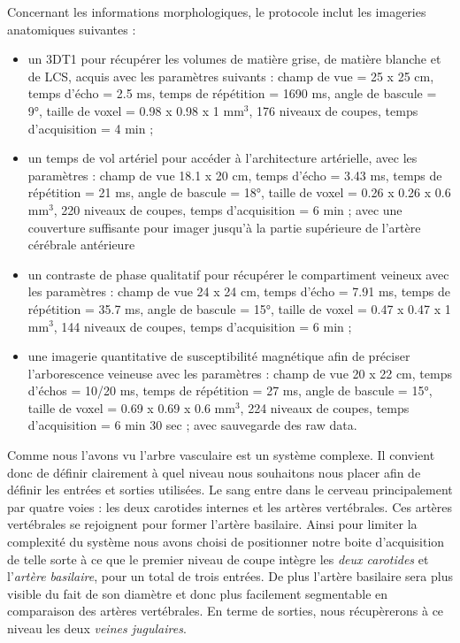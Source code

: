 Concernant les informations morphologiques, le protocole inclut les imageries anatomiques suivantes :
\begin{itemize}
\item un 3DT1 pour récupérer les volumes de matière grise, de matière blanche et de LCS, acquis avec les paramètres suivants : champ de vue = 25 x 25 cm, temps d’écho = 2.5 ms, temps de répétition = 1690 ms, angle de bascule = 9°, taille de voxel = 0.98 x 0.98 x 1 mm$^3$, 176 niveaux de coupes, temps d'acquisition = 4 min ;
\item un temps de vol artériel pour accéder à l’architecture artérielle, avec les paramètres : champ de vue 18.1 x 20 cm, temps d’écho = 3.43 ms, temps de répétition = 21 ms, angle de bascule = 18°, taille de voxel = 0.26 x 0.26 x 0.6 mm$^3$, 220 niveaux de coupes,  temps d'acquisition = 6 min ; avec une couverture suffisante pour imager jusqu’à la partie supérieure de l’artère cérébrale antérieure
\item un contraste de phase qualitatif pour récupérer le compartiment veineux avec les paramètres : champ de vue 24 x 24 cm, temps d’écho = 7.91 ms, temps de répétition = 35.7 ms, angle de bascule = 15°, taille de voxel = 0.47 x 0.47 x 1 mm$^3$, 144 niveaux de coupes,  temps d'acquisition = 6 min ;
\item une imagerie quantitative de susceptibilité magnétique afin de préciser l’arborescence veineuse avec les paramètres : champ de vue 20 x 22 cm, temps d’échos = 10/20 ms, temps de répétition = 27 ms, angle de bascule = 15°, taille de voxel = 0.69 x 0.69 x 0.6 mm$^3$, 224 niveaux de coupes,  temps d'acquisition = 6 min 30 sec ; avec sauvegarde des raw data.
\end{itemize}
Comme nous l’avons vu l’arbre vasculaire est un système complexe. Il convient donc de définir clairement à quel niveau nous souhaitons nous placer afin de définir les entrées et sorties utilisées. Le sang entre dans le cerveau principalement par quatre voies : les deux carotides internes et les artères vertébrales. Ces artères vertébrales se rejoignent pour former l’artère basilaire. Ainsi pour limiter la complexité du système nous avons choisi de positionner notre boite d’acquisition de telle sorte à ce que le premier niveau de coupe intègre les {\em deux carotides} et l’{\em artère basilaire}, pour un total de trois entrées. De plus l’artère basilaire sera plus visible du fait de son diamètre et donc plus facilement segmentable en comparaison des artères vertébrales. En terme de sorties, nous récupèrerons à ce niveau les deux {\em veines jugulaires}.


